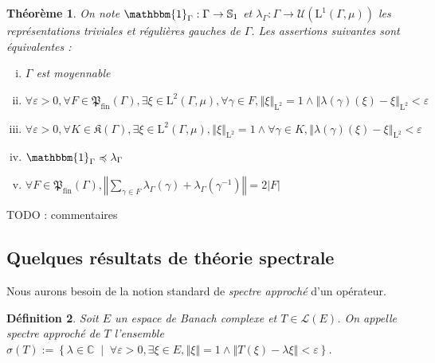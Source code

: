 \documentclass[a4paper,12pt]{article}
\newtheorem{theorem}{Théorème}[section]
\newtheorem{definition}[theorem]{Définition}
\newcommand{\C}{\mathbb{C}}
\newcommand{\norm}[1]{\left\Vert #1\right\Vert}
\newcommand{\abs}[1]{\left\vert#1\right\vert}
\newcommand{\card}[1]{\abs{#1}}
\newcommand{\set}[1]{\left\{ #1 \right\}}
\newcommand{\indic}{\mathbbm{1}}
\newcommand{\tq}{\;\middle|\;}
\newcommand{\inv}{^{-1}}
\newcommand{\finparts}{\mathfrak{P}_{\mathrm{fin}}}
\newcommand{\TODO}[1]{{\color{red}TODO :} #1}
\newcommand{\wle}{\preccurlyeq}
\DeclareMathOperator{\Sp}{Sp}
\begin{document}
\begin{theorem}\label{amenable_weak_contain}
    On note $\indic_\Gamma:\Gamma\to\mathbb{S}_1$ et $\lambda_\Gamma:\Gamma\to\mathcal{U}(\mathrm{L}^1(\Gamma, \mu))$
    les représentations triviales et régulières gauches de $\Gamma$. Les assertions suivantes sont équivalentes :
    \begin{enumerate}[(i)]
        \item\label{amenable_weak_contain/amenable} $\Gamma$ est moyennable
        \item\label{amenable_weak_contain/weak_almost_invariant} $\forall\varepsilon>0, \forall F\in\finparts(\Gamma), \exists\xi\in \mathrm{L}^2(\Gamma, \mu), \forall \gamma\in F, \norm{\xi}_{\mathrm{L}^2} = 1 \land \norm{\lambda(\gamma)(\xi) - \xi}_{\mathrm{L}^2}<\varepsilon$
        \item\label{amenable_weak_contain/strong_almost_invariant} $\forall\varepsilon>0, \forall K\in\mathfrak{K}(\Gamma), \exists\xi\in \mathrm{L}^2(\Gamma, \mu), \norm{\xi}_{\mathrm{L}^2} = 1 \land \forall \gamma\in K, \norm{\lambda(\gamma)(\xi) - \xi}_{\mathrm{L}^2}<\varepsilon$
        \item\label{amenable_weak_contain/weak_contain} $\indic_\Gamma\wle\lambda_\Gamma$
        \item\label{amenable_weak_contain/norm_eq_two} $\forall F\in\finparts(\Gamma), \norm{\sum_{\gamma\in F}\lambda_\Gamma(\gamma)+\lambda_\Gamma(\gamma\inv)} = 2\card{F}$
    \end{enumerate}
\end{theorem}

\TODO{commentaires}

\subsection{Quelques résultats de théorie spectrale}

Nous aurons besoin de la notion standard de \emph{spectre approché} d'un opérateur.

\begin{definition}
    Soit $E$ un espace de Banach complexe et $T\in\mathcal{L}(E)$. 
    On appelle \emph{spectre approché de $T$} l'ensemble $\sigma(T) := \set{\lambda\in\C\tq\forall\varepsilon>0, \exists\xi\in E, \norm{\xi}=1\land\norm{T(\xi)-\lambda\xi}<\varepsilon}$.
\end{definition}
\end{document}
